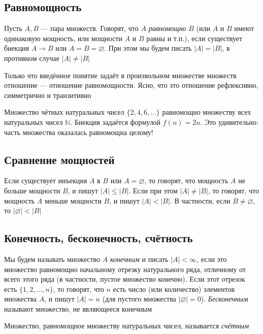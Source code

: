 \documentclass[a4paper,12pt]{article}
\theoremstyle{definition}
\theoremstyle{plain}
\theoremstyle{remark}
\begin{document}
	\subsection{Равномощность}
	Пусть $A, B$ — пара множеств. Говорят, что $A$ \textit{равномощно} $B$ (или $A$ и $B$ имеют одинаковую мощность, или мощности $A$ и $B$ равны и т.п.), если существует биекция $A \to B$ или $A = B = \varnothing$. При этом мы будем писать $|A| = |B|$, в противном случае $|A| \neq |B|$
	
	\medskip
	
	Только что введённое понятие задаёт в произвольном множестве множеств отношение — отношение равномощности. Ясно, что это отношение рефлексивно, симметрично и транзитивно
	
	\begin{tcolorbox}[colback=blue!5, colframe=blue!40!black, title=Пример равномощности]
		Множество чётных натуральных чисел $\{2, 4, 6, \dots\}$ равномощно множеству всех натуральных чисел $\mathbb{N}$. Биекция задаётся формулой $f(n) = 2n$. Это удивительно: часть множества оказалась равномощна целому!
	\end{tcolorbox}
	
	\medskip
	
	\subsection{Сравнение мощностей}
	Если существует инъекция $A$ в $B$ или $A = \varnothing$, то говорят, что мощность $A$ не больше мощности $B$, и пишут $|A| \leq |B|$. Если при этом $|A| \neq |B|$, то говорят, что мощность $A$ меньше мощности $B$, и пишут $|A| < |B|$. В частности, если $B \neq \varnothing$, то $|\varnothing| < |B|$
	
	
	\medskip
	\subsection{Конечность, бесконечность, счётность}
	Мы будем называть множество $A$ \textit{конечным} и писать $|A| < \infty$, если это множество равномощно начальному отрезку натурального ряда, отличному от всего этого ряда (в частности, пустое множество конечно). Если этот отрезок есть $\{1, 2, \dots, n\}$, то говорят, что $n$ есть число (или количество) элементов множества $A$, и пишут $|A| = n$ (для пустого множества $|\varnothing| = 0$). \textit{Бесконечным} называют множество, не являющееся конечным
	
	\medskip
	Множество, равномощное множеству натуральных чисел, называется \textit{счётным}
	
\end{document}

